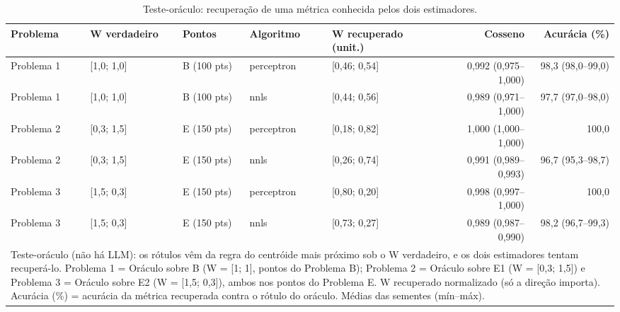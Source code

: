 \begin{table}[htbp]
\centering
\small
\caption{Teste-oráculo: recuperação de uma métrica conhecida pelos dois estimadores.}
\label{tab:bloco1_oraculo_recuperacao_W}
\begin{tabular}{lllllrr}
\toprule
Problema & W verdadeiro & Pontos & Algoritmo & W recuperado (unit.) & Cosseno & Acurácia (\%) \\
\midrule
Problema 1 & [1,0; 1,0] & B (100 pts) & perceptron & [0,46; 0,54] & 0,992 (0,975–1,000) & 98,3 (98,0–99,0) \\
Problema 1 & [1,0; 1,0] & B (100 pts) & nnls & [0,44; 0,56] & 0,989 (0,971–1,000) & 97,7 (97,0–98,0) \\
\midrule
Problema 2 & [0,3; 1,5] & E (150 pts) & perceptron & [0,18; 0,82] & 1,000 (1,000–1,000) & 100,0 \\
Problema 2 & [0,3; 1,5] & E (150 pts) & nnls & [0,26; 0,74] & 0,991 (0,989–0,993) & 96,7 (95,3–98,7) \\
\midrule
Problema 3 & [1,5; 0,3] & E (150 pts) & perceptron & [0,80; 0,20] & 0,998 (0,997–1,000) & 100,0 \\
Problema 3 & [1,5; 0,3] & E (150 pts) & nnls & [0,73; 0,27] & 0,989 (0,987–0,990) & 98,2 (96,7–99,3) \\
\bottomrule
\multicolumn{7}{p{0.95\linewidth}}{\footnotesize Teste-oráculo (não há LLM): os rótulos vêm da regra do centróide mais próximo sob o W verdadeiro, e os dois estimadores tentam recuperá-lo. Problema 1 = Oráculo sobre B (W = [1; 1], pontos do Problema B); Problema 2 = Oráculo sobre E1 (W = [0,3; 1,5]) e Problema 3 = Oráculo sobre E2 (W = [1,5; 0,3]), ambos nos pontos do Problema E. W recuperado normalizado (só a direção importa). Acurácia (\%) = acurácia da métrica recuperada contra o rótulo do oráculo. Médias das sementes (mín–máx).} \\
\end{tabular}
\end{table}
